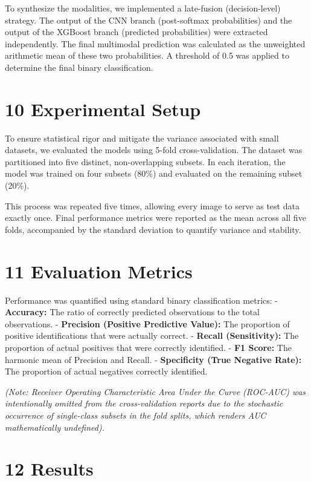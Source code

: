 To synthesize the modalities, we implemented a late-fusion
(decision-level) strategy. The output of the CNN branch (post-softmax
probabilities) and the output of the XGBoost branch (predicted
probabilities) were extracted independently. The final multimodal
prediction was calculated as the unweighted arithmetic mean of these two
probabilities. A threshold of 0.5 was applied to determine the final
binary classification.

\section{10 Experimental Setup}\label{experimental-setup}

To ensure statistical rigor and mitigate the variance associated with
small datasets, we evaluated the models using 5-fold cross-validation.
The dataset was partitioned into five distinct, non-overlapping subsets.
In each iteration, the model was trained on four subsets (80\%) and
evaluated on the remaining subset (20\%).

This process was repeated five times, allowing every image to serve as
test data exactly once. Final performance metrics were reported as the
mean across all five folds, accompanied by the standard deviation to
quantify variance and stability.

\section{11 Evaluation Metrics}\label{evaluation-metrics}

Performance was quantified using standard binary classification metrics:
- \textbf{Accuracy:} The ratio of correctly predicted observations to
the total observations. - \textbf{Precision (Positive Predictive
Value):} The proportion of positive identifications that were actually
correct. - \textbf{Recall (Sensitivity):} The proportion of actual
positives that were correctly identified. - \textbf{F1 Score:} The
harmonic mean of Precision and Recall. - \textbf{Specificity (True
Negative Rate):} The proportion of actual negatives correctly
identified.

\emph{(Note: Receiver Operating Characteristic Area Under the Curve
(ROC-AUC) was intentionally omitted from the cross-validation reports
due to the stochastic occurrence of single-class subsets in the fold
splits, which renders AUC mathematically undefined).}

\section{12 Results}\label{results}

